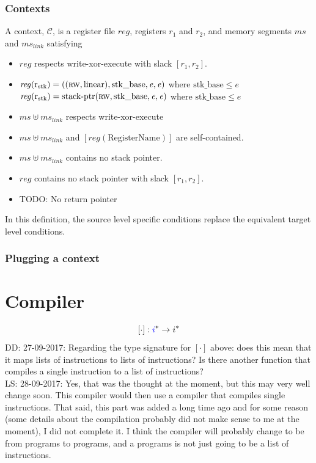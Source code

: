 \documentclass[a3paper]{article}
\newcommand\lau[1]{{\color{purple} \sf \footnotesize {LS: #1}}\\}
\newcommand\dominique[1]{{\color{purple} \sf \footnotesize {DD: #1}}\\}
\newcommand{\fun}{\rightarrow}
\newcommand{\sourcecolor}{\color{blue}}
\newcommand{\src}[1]{{\sourcecolor #1}}
\newcommand{\targetcolor}[1]{\color{black}}
\newcommand{\trg}[1]{{\targetcolor{} #1}}
\newcommand{\shareddom}[1]{\mathrm{#1}}
\newcommand{\RegName}{\shareddom{RegisterName}}
\newcommand{\stkptr}[1]{\mathrm{stack\text{-}ptr}(#1)}
\newcommand{\context}{\mathscr{C}}
\newcommand{\var}[1]{\mathit{#1}}
\newcommand{\reg}{\var{reg}}
\newcommand{\ms}{\var{ms}}
\newcommand{\link}{\var{link}}
\newcommand{\eaddr}{\var{e}}
\newcommand{\constant}[1]{\mathrm{#1}}
\newcommand{\stkb}{\constant{stk\_base}}
\newcommand{\rstk}{\mathrm{r}_\mathrm{stk}}
\newcommand{\plainlinearity}[1]{\mathrm{#1}}
\newcommand{\linear}{\plainlinearity{linear}}
\newcommand{\plainperm}[1]{\textsc{#1}}
\newcommand{\rw}{\plainperm{rw}}
\newcommand{\comp}[1]{[#1]}
\begin{document}
\subsubsection{Contexts}
\begin{definition}
  \label{def:context}
  A context, $\context$, is a register file $\reg$, registers $r_1$ and $r_2$, and memory segments $\ms$ and $\ms_\link$ satisfying
  \begin{itemize}
  \item $\reg$ respects write-xor-execute with slack $[r_1,r_2]$.
  \item $\reg(\rstk) = ((\rw,\linear),\stkb,\eaddr,\eaddr)$ where $\stkb \leq \eaddr$\\
        {\sourcecolor{}$\reg(\rstk) = \stkptr{\rw,\stkb,\eaddr,\eaddr}$ where $\stkb \leq \eaddr$}
  \item $\ms \uplus \ms_\link$ respects write-xor-execute
  \item $\ms \uplus \ms_\link$ and $[\reg(\RegName)]$ are self-contained.
  \item $\ms \uplus \ms_\link$ contains no stack pointer.
  \item $\reg$ contains no stack pointer with slack $[r_1,r_2]$.
  \item {\color{red}TODO: No return pointer}
  \end{itemize}
In this definition, the source level specific conditions replace the equivalent target level conditions.
\end{definition}

\subsubsection{Plugging a context}




\section{Compiler}
\label{sec:compiler}
\[
\comp{\cdot} : \src{i}^* \fun \trg{i}^*
\]
\dominique{27-09-2017: Regarding the type signature for $[\cdot]$ above: does this mean that it maps lists of instructions to lists of instructions? Is there another function that compiles a single instruction to a list of instructions?}
\lau{28-09-2017: Yes, that was the thought at the moment, but this may very well change soon. This compiler would then use a compiler that compiles single instructions. That said, this part was added a long time ago and for some reason (some details about the compilation probably did not make sense to me at the moment), I did not complete it. I think the compiler will probably change to be from programs to programs, and a programs is not just going to be a list of instructions.}
\end{document}
